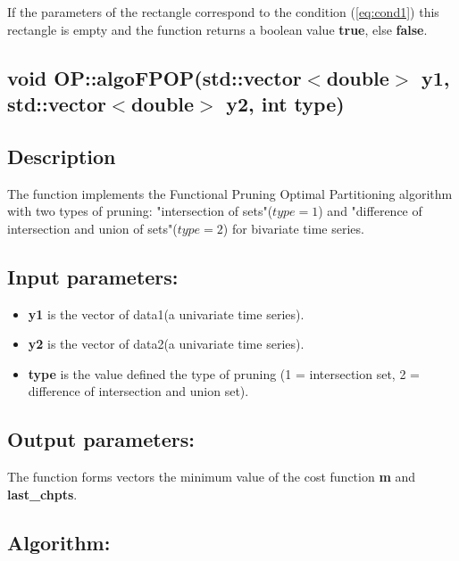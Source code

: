 \documentclass{report}
\begin{document}
If the parameters of the rectangle correspond to the condition (\ref{eq:cond1}) this rectangle is empty and the function returns a boolean value {\bfseries true}, else  {\bfseries false}.

\newpage

\label{algoFPOP}
\begin{center} 
	\section*{\bfseries void OP::algoFPOP(std::vector$<$double$>$ y1, std::vector$<$double$>$ y2, int type)}
\end{center} 

\subsection*{Description}

	The function implements the Functional Pruning Optimal Partitioning algorithm with two types of pruning: "intersection of sets"($type = 1$) and "difference of intersection and union of sets"($type = 2$) for bivariate time series. 

\subsection*{Input parameters:}

\begin{itemize}
	\item {\bfseries y1} is the vector of data1(a univariate time series).
	
	\item {\bfseries y2} is the vector of data2(a univariate time series).
	
	\item {\bfseries type} is the value defined the type of pruning (1 = intersection set, 2 = difference of intersection and union set).
\end{itemize}

\subsection*{Output parameters:}

The function forms vectors the minimum value of the cost function {\bfseries m} and {\bfseries last\_chpts}.

\subsection*{Algorithm:}
\end{document}

